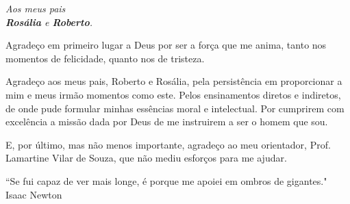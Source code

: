 \documentclass{ufpatcc}
\begin{document}
\ufpaPaginaDeRosto
\thispagestyle{empty}


\ufpaPagRostodo
{}
\thispagestyle{empty}
\setcounter{page}{1}

\ufpaPaginaDeAprovacao
\thispagestyle{empty}


\setcounter{page}{2}
\begin{ufpaOferecimento}
%
\textit{Aos meus pais\\ \textbf{Rosália} e \textbf{Roberto}.}
\end{ufpaOferecimento}
\setcounter{page}{4}





\begin{ufpaAgradecimentos}


%

Agradeço em primeiro lugar a Deus por ser a força que me anima, tanto nos momentos de felicidade, quanto nos de tristeza.

Agradeço aos meus pais, Roberto e Rosália, pela persistência em proporcionar a mim e meus irmão momentos como este. Pelos ensinamentos diretos e indiretos, de onde pude formular minhas essências moral e intelectual. Por cumprirem com excelência a missão dada por Deus de me instruirem a ser o homem que sou.

E, por último, mas não menos importante, agradeço ao meu orientador, Prof. Lamartine Vilar de Souza, que não mediu esforços para me ajudar.


\end{ufpaAgradecimentos}
\setcounter{page}{5}


\begin{ufpaEpigrafe}
``Se fui capaz de ver mais longe, é porque me apoiei em ombros de gigantes."\\
  Isaac Newton
\end{ufpaEpigrafe}
\end{document}

